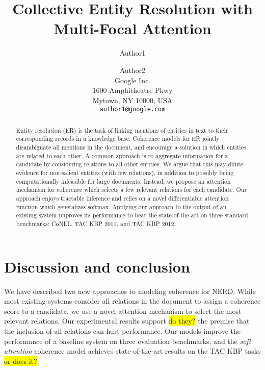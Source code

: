\documentclass[11pt]{article}
\title{Collective Entity Resolution with Multi-Focal Attention}
\author{Author1 \and Author2\\
	    Google Inc. \\
	    1600 Amphitheatre Pkwy\\
	    Mytown, NY 10000, USA\\
	    {\tt author1@google.com}}
\date{}
\begin{document}
\maketitle

\begin{abstract}
Entity resolution (ER) is the task of linking mentions of entities in text to their corresponding records in a knowledge base. Coherence models for ER jointly disambiguate all mentions in the document, and encourage a solution in which entities are related to each other. A common approach is to aggregate information for a candidate by considering relations to all other entities. We argue that this may dilute evidence for non-salient entities (with few relations), in addition to possibly being computationally infeasible for large documents. Instead, we propose an attention mechanism for coherence which selects a few relevant relations for each candidate. Our approach enjoys tractable inference and relies on a novel differentiable attention function which generalizes softmax. 
Applying our approach to the output of an existing system improves its performance to beat the state-of-the-art on three standard benchmarks: CoNLL, TAC KBP 2011, and TAC KBP 2012.
\end{abstract}










\section{Discussion and conclusion}
We have described two new approaches to modeling coherence for NERD. While most existing systems consider all relations in the document to assign a coherence score to a candidate, we use a novel attention mechanism to select the most relevant relations. Our experimental results support \hl{do they?} the premise that the inclusion of all relations can hurt performance. Our models improve the performance of a baseline system on three evaluation benchmarks, and the \emph{soft attention} coherence model achieves state-of-the-art results on the TAC KBP tasks \hl{or does it?}




\small


\normalsize 
\end{document}
